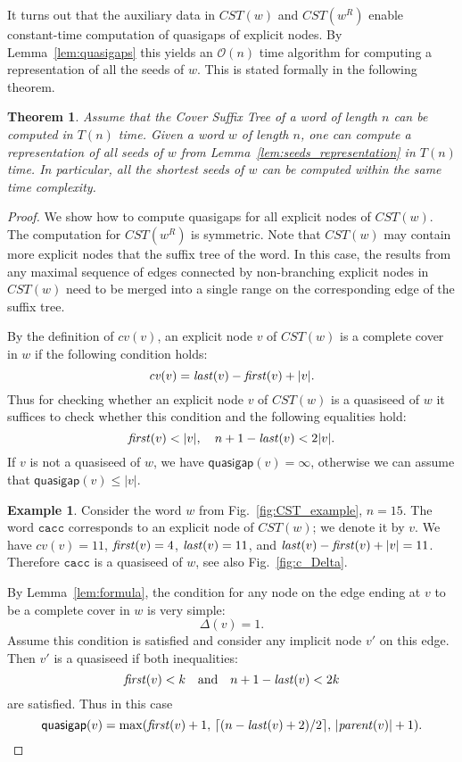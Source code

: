 \documentclass{article}
\theoremstyle{theorem}
\newtheorem{theorem}{Theorem}
\theoremstyle{definition}
\newtheorem{example}{Example}
\newcommand{\CST}{\mathit{CST}}
\newcommand{\firstocc}{\mbox{\textit{first}}}
\newcommand{\lastocc}{\mbox{\textit{last}}}
\renewcommand{\c}{\mathit{cv}}
\newcommand{\Oh}{\mathcal{O}}
\begin{document}
  It turns out that the auxiliary data in $\CST(w)$ and $\CST(w^R)$ enable constant-time computation
  of quasigaps of explicit nodes.
  By Lemma~\ref{lem:quasigaps} this yields an $\Oh(n)$ time algorithm for computing a representation
  of all the seeds of $w$.
  This is stated formally in the following theorem.

  \begin{theorem}\label{thm:seeds}
    Assume that the Cover Suffix Tree of a word of length $n$ can be computed in $T(n)$ time.
    Given a word $w$ of length $n$, one can compute a representation of all seeds of $w$
    from Lemma~\ref{lem:seeds_representation} in $T(n)$ time.
    In particular, all the shortest seeds of $w$ can be computed within the same time complexity.
  \end{theorem}
  \begin{proof}
    We show how to compute quasigaps for all explicit nodes of $\CST(w)$.
    The computation for $\CST(w^R)$ is symmetric.
    Note that $\CST(w)$ may contain more explicit nodes that the suffix tree of the word.
    In this case, the results from any maximal sequence of edges connected by non-branching explicit nodes
    in $\CST(w)$ need to be merged into a single range on the corresponding edge of the suffix tree.

    By the definition of $\c(v)$, an explicit node $v$ of $\CST(w)$ is a complete cover in $w$
    if the following condition holds:
    $$\c(v) = \lastocc(v) - \firstocc(v) + |v|.$$
    Thus for checking whether an explicit node $v$ of $\CST(w)$ is a quasiseed of $w$
    it suffices to check whether this condition and the following equalities hold:
    $$\firstocc(v) < |v|,\quad n+1 - \lastocc(v) < 2|v|.$$
    If $v$ is not a quasiseed of $w$, we have $\textsf{quasigap}(v)=\infty$, otherwise
    we can assume that $\textsf{quasigap}(v) \le |v|$.

    \begin{example}
      Consider the word $w$ from Fig.~\ref{fig:CST_example}, $n=15$.
      The word $\texttt{cacc}$ corresponds to an explicit node of $\CST(w)$; we denote it by $v$.
      We have $\c(v)=11$, $\firstocc(v)=4$, $\lastocc(v)=11$, and $\lastocc(v) - \firstocc(v) + |v|=11$.
      Therefore $\texttt{cacc}$ is a quasiseed of $w$, see also Fig.~\ref{fig:c_Delta}.
    \end{example}

    By Lemma~\ref{lem:formula}, the condition for any node on the edge ending at $v$ to be
    a complete cover in $w$ is very simple:
    $$\Delta(v) = 1.$$
    Assume this condition is satisfied and consider any implicit node $v'$ on this edge.
    Then $v'$ is a quasiseed if both inequalities:
    $$\firstocc(v) < k\quad\mbox{and}\quad n+1 - \lastocc(v) < 2k$$
    are satisfied.
    Thus in this case
    $$\textsf{quasigap}(v)=\max(\firstocc(v)+1,\,\lceil (n-\lastocc(v)+2)/2 \rceil,\,|\mathit{parent}(v)|+1).$$
  

\end{proof}
\end{document}
